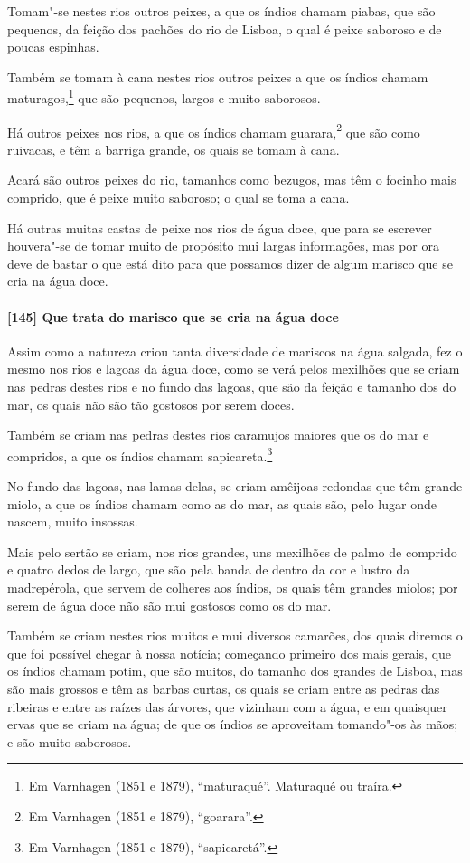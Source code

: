 \begin{linenumbers}
Tomam"-se nestes rios outros peixes, a que os índios chamam piabas, que são pequenos, da
feição dos pachões do rio de Lisboa, o qual é peixe saboroso e de poucas espinhas.

Também se tomam à cana nestes rios outros peixes a que os índios chamam
maturagos,\footnote{ Em Varnhagen (1851 e 1879), ``maturaqué''. Maturaqué ou traíra.} que
são pequenos, largos e muito saborosos.

Há outros peixes nos rios, a que os índios chamam guarara,\footnote{ Em Varnhagen (1851 e
1879), ``goarara''.} que são como ruivacas, e têm a barriga grande, os quais se tomam à
cana.

Acará são outros peixes do rio, tamanhos como bezugos, mas têm o focinho mais comprido,
que é peixe muito saboroso; o qual se toma a cana.

Há outras muitas castas de peixe nos rios de água doce, que para se escrever houvera"-se de
tomar muito de propósito mui largas informações, mas por ora deve de bastar o que está
dito para que possamos dizer de algum marisco que se cria na água doce.

\paragraph{[145] Que trata do marisco que se cria na água doce}\quad
Assim como a natureza criou tanta diversidade de mariscos na água salgada, fez o mesmo nos
rios e lagoas da água doce, como se verá pelos mexilhões que se criam nas pedras destes
rios e no fundo das lagoas, que são da feição e tamanho dos do mar, os quais não são tão
gostosos por serem doces.

Também se criam nas pedras destes rios caramujos maiores que os do mar e compridos, a que
os índios chamam sapicareta.\footnote{ Em Varnhagen (1851 e 1879), ``sapicaretá''.}

No fundo das lagoas, nas lamas delas, se criam amêijoas redondas que têm grande miolo, a
que os índios chamam como as do mar, as quais são, pelo lugar onde nascem, muito insossas.

Mais pelo sertão se criam, nos rios grandes, uns mexilhões de palmo de comprido e quatro
dedos de largo, que são pela banda de dentro da cor e lustro da madrepérola, que servem de
colheres aos índios, os quais têm grandes miolos; por serem de água doce não são mui
gostosos como os do mar.

Também se criam nestes rios muitos e mui diversos camarões, dos quais diremos o que foi
possível chegar à nossa notícia; começando primeiro dos mais gerais, que os índios chamam
potim, que são muitos, do tamanho dos grandes de Lisboa, mas são mais grossos e têm as
barbas curtas, os quais se criam entre as pedras das ribeiras e entre as raízes das
árvores, que vizinham com a água, e em quaisquer ervas que se criam na água; de que os
índios se aproveitam tomando"-os às mãos; e são muito saborosos.


\end{linenumbers}
